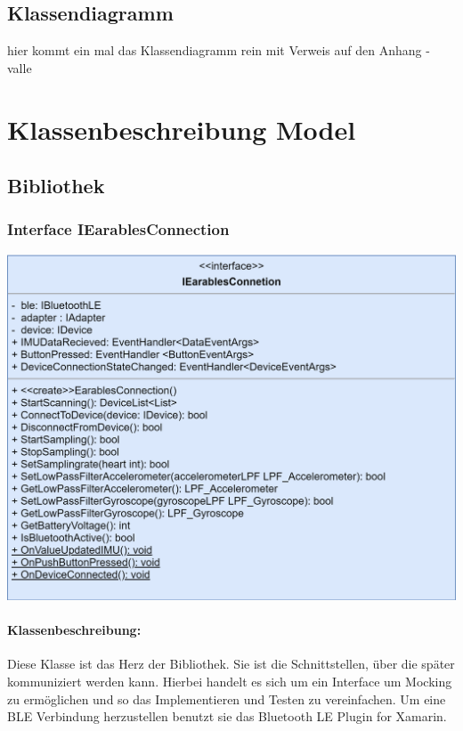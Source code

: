 \documentclass[a4paper,12pt]{article}
\begin{document}
  \subsection{Klassendiagramm}
hier kommt ein mal das Klassendiagramm rein mit Verweis auf den Anhang - valle
\clearpage
\section{Klassenbeschreibung Model}
\subsection{Bibliothek}

	\subsubsection{Interface IEarablesConnection}
	
	\includegraphics[width=\textwidth]{bilder/BibPackageKlassen/IEarablesConnection.png}

\paragraph{Klassenbeschreibung:}
Diese Klasse ist das Herz der Bibliothek. Sie ist die Schnittstellen, über die später kommuniziert werden kann. Hierbei handelt es sich um ein Interface um Mocking zu ermöglichen und so das Implementieren und Testen zu vereinfachen. Um eine BLE Verbindung herzustellen benutzt sie das \glqq Bluetooth LE Plugin for Xamarin\grqq{}.
\end{document}
